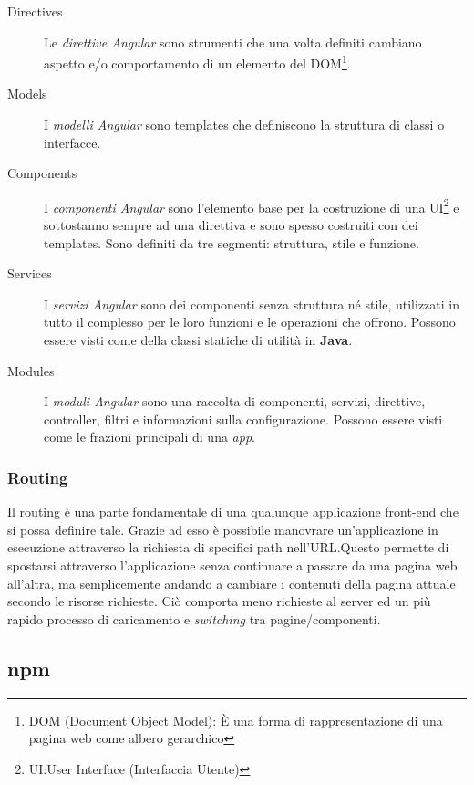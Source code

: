 \documentclass[twoside]{supsistudent}
\begin{document}
\begin{description}

  \item[Directives] Le \textit{direttive Angular} sono strumenti che una volta
  definiti cambiano aspetto e/o comportamento di un elemento del 
  DOM\footnote{DOM (Document Object Model): È una forma di rappresentazione di
  una pagina web come albero gerarchico}. 

  \item[Models] I \textit{modelli Angular} sono templates che definiscono la
  struttura di classi o interfacce.

  \item[Components] I \textit{componenti Angular} sono l'elemento base per la
  costruzione di una UI\footnote{UI:\@ User Interface (Interfaccia Utente)}
  e sottostanno sempre ad una direttiva e sono spesso costruiti con dei 
  templates. Sono definiti da tre segmenti: struttura, stile e funzione.  

  \item[Services] I \textit{servizi Angular} sono dei componenti senza 
  struttura né stile, utilizzati in tutto il complesso per le loro funzioni
  e le operazioni che offrono. Possono essere visti come della classi statiche
  di utilità in \textbf{Java}.

  \item[Modules] I \textit{moduli Angular} sono una raccolta di componenti, 
  servizi, direttive, controller, filtri e informazioni sulla configurazione.
  Possono essere visti come le frazioni principali di una \textit{app}.

\end{description}

\subsubsection{Routing}

Il routing è una parte fondamentale di una qualunque applicazione front-end
che si possa definire tale. Grazie ad esso è possibile manovrare 
un’applicazione in esecuzione attraverso la richiesta di specifici path
nell'URL.\@ Questo permette di spostarsi attraverso l'applicazione senza 
continuare a passare da una pagina web all'altra, ma semplicemente andando a
cambiare i contenuti della pagina attuale secondo le risorse richieste. Ciò 
comporta meno richieste al server ed un più rapido processo di caricamento
e \textit{switching} tra pagine/componenti.

\subsection{npm}
\end{document}
